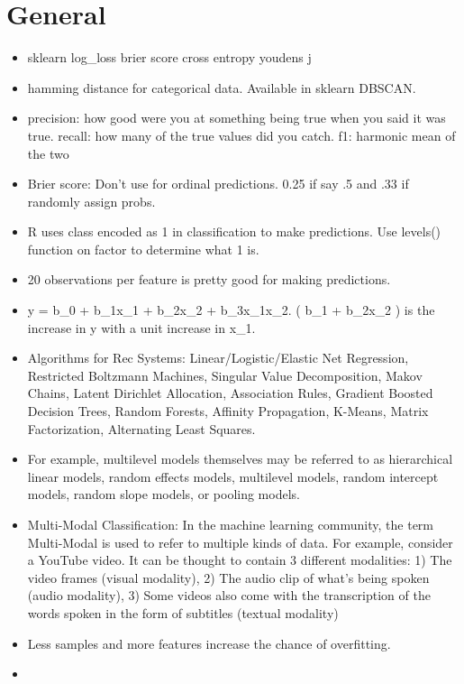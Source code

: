 \documentclass[]{book}
\begin{document}
\section{General}\label{general-3}

\begin{itemize}
\item
  sklearn log\_loss \textbar{} brier score\textbar{} cross entropy
  \textbar{} youdens j
\item
  hamming distance for categorical data. Available in sklearn DBSCAN.
\item
  precision: how good were you at something being true when you said it
  was true. recall: how many of the true values did you catch. f1:
  harmonic mean of the two
\item
  Brier score: Don't use for ordinal predictions. 0.25 if say .5 and .33
  if randomly assign probs.
\item
  R uses class encoded as 1 in classification to make predictions. Use
  levels() function on factor to determine what 1 is.
\item
  20 observations per feature is pretty good for making predictions.
\item
  y = b\_0 + b\_1x\_1 + b\_2x\_2 + b\_3x\_1x\_2. ( b\_1 + b\_2x\_2 ) is
  the increase in y with a unit increase in x\_1.
\item
  Algorithms for Rec Systems: Linear/Logistic/Elastic Net Regression,
  Restricted Boltzmann Machines, Singular Value Decomposition, Makov
  Chains, Latent Dirichlet Allocation, Association Rules, Gradient
  Boosted Decision Trees, Random Forests, Affinity Propagation, K-Means,
  Matrix Factorization, Alternating Least Squares.
\item
  For example, multilevel models themselves may be referred to as
  hierarchical linear models, random effects models, multilevel models,
  random intercept models, random slope models, or pooling models.
\item
  Multi-Modal Classification: In the machine learning community, the
  term Multi-Modal is used to refer to multiple kinds of data. For
  example, consider a YouTube video. It can be thought to contain 3
  different modalities: 1) The video frames (visual modality), 2) The
  audio clip of what's being spoken (audio modality), 3) Some videos
  also come with the transcription of the words spoken in the form of
  subtitles (textual modality)
\item
  Less samples and more features increase the chance of overfitting.
\item

\end{itemize}
\end{document}
